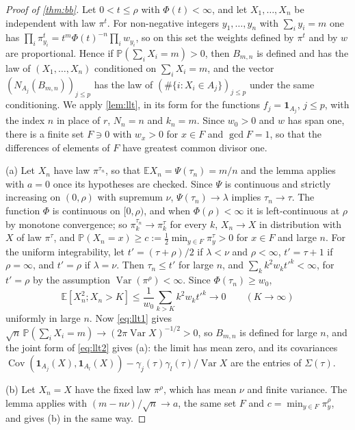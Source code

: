 \documentclass[11pt]{amsart}
\theoremstyle{definition}
\newcommand{\E}{\mathbb{E}}
\newcommand{\Prob}{\mathbb{P}}
\newcommand{\Ind}{\mathbf{1}}
\DeclareMathOperator{\Var}{Var}
\DeclareMathOperator{\Cov}{Cov}
\begin{document}
\begin{proof}[Proof of \cref{thm:bb}]
Let $0<t\le\rho$ with $\Phi(t)<\infty$, and let $X_1,\dots,X_n$ be independent with law $\pi^t$. For non-negative integers $y_1,\dots,y_n$ with $\sum_iy_i=m$ one has $\prod_i\pi^t_{y_i}=t^m\Phi(t)^{-n}\prod_iw_{y_i}$, so on this set the weights defined by $\pi^t$ and by $w$ are proportional. Hence if $\Prob(\sum_iX_i=m)>0$, then $B_{m,n}$ is defined and has the law of $(X_1,\dots,X_n)$ conditioned on $\sum_iX_i=m$, and the vector $(N_{A_j}(B_{m,n}))_{j\le p}$ has the law of $(\#\{i:X_i\in A_j\})_{j\le p}$ under the same conditioning. We apply \cref{lem:llt}, in its form for the functions $f_j=\Ind_{A_j}$, $j\le p$, with the index $n$ in place of $r$, $N_n=n$ and $k_n=m$. Since $w_0>0$ and $w$ has span one, there is a finite set $F\ni0$ with $w_x>0$ for $x\in F$ and $\gcd F=1$, so that the differences of elements of $F$ have greatest common divisor one.

(a) Let $X_n$ have law $\pi^{\tau_n}$, so that $\E X_n=\Psi(\tau_n)=m/n$ and the lemma applies with $a=0$ once its hypotheses are checked. Since $\Psi$ is continuous and strictly increasing on $(0,\rho)$ with supremum $\nu$, $\Psi(\tau_n)\to\lambda$ implies $\tau_n\to\tau$. The function $\Phi$ is continuous on $[0,\rho)$, and when $\Phi(\rho)<\infty$ it is left-continuous at $\rho$ by monotone convergence; so $\pi^{\tau_n}_k\to\pi^\tau_k$ for every $k$, $X_n\to X$ in distribution with $X$ of law $\pi^\tau$, and $\Prob(X_n=x)\ge c:=\frac12\min_{y\in F}\pi^\tau_y>0$ for $x\in F$ and large $n$. For the uniform integrability, let $t'=(\tau+\rho)/2$ if $\lambda<\nu$ and $\rho<\infty$, $t'=\tau+1$ if $\rho=\infty$, and $t'=\rho$ if $\lambda=\nu$. Then $\tau_n\le t'$ for large $n$, and $\sum_kk^2w_kt'^k<\infty$, for $t'=\rho$ by the assumption $\Var(\pi^\rho)<\infty$. Since $\Phi(\tau_n)\ge w_0$,
\[
\E[X_n^2;X_n>K]\le\frac1{w_0}\sum_{k>K}k^2w_kt'^k\longrightarrow0\qquad(K\to\infty)
\]
uniformly in large $n$. Now \eqref{eq:llt1} gives $\sqrt n\,\Prob(\sum_iX_i=m)\to(2\pi\Var X)^{-1/2}>0$, so $B_{m,n}$ is defined for large $n$, and the joint form of \eqref{eq:llt2} gives (a): the limit has mean zero, and its covariances $\Cov(\Ind_{A_j}(X),\Ind_{A_l}(X))-\gamma_j(\tau)\gamma_l(\tau)/\Var X$ are the entries of $\Sigma(\tau)$.

(b) Let $X_n=X$ have the fixed law $\pi^\rho$, which has mean $\nu$ and finite variance. The lemma applies with $(m-n\nu)/\sqrt n\to a$, the same set $F$ and $c=\min_{y\in F}\pi^\rho_y$, and gives (b) in the same way.
\end{proof}
\end{document}
